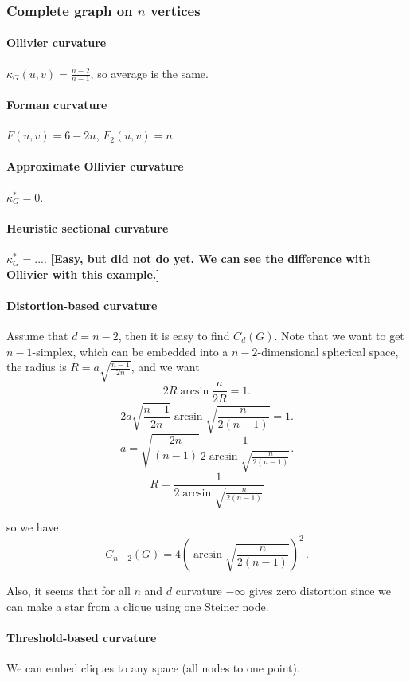 \documentclass{article} %
\begin{document}
\subsubsection{Complete graph on $n$ vertices}

\paragraph{Ollivier curvature}  
$\kappa_G(u,v) = \frac{n-2}{n-1}$, so average is the same.

\paragraph{Forman curvature} 

$F(u,v) = 6 - 2n$, $F_2(u,v) = n$.

\paragraph{Approximate Ollivier curvature} 

$\kappa_G^* = 0$.

\paragraph{Heuristic sectional curvature} 

$\kappa_G^* = ...$. \textbf{[Easy, but did not do yet. We can see the difference with Ollivier with this example.]}

\paragraph{Distortion-based curvature}

Assume that $d = n-2$, then it is easy to find $C_d(G)$. Note that we want to get $n-1$-simplex, which can be embedded into a $n-2$-dimensional spherical space, the radius is $R = a\sqrt{\frac{n-1}{2n}}$, and we want
\[
2 R \arcsin \frac{a}{2R} = 1.
\]
\[
2 a\sqrt{\frac{n-1}{2n}} \arcsin \sqrt{\frac{n}{2(n-1)}} = 1.
\]
\[
a  = \sqrt{\frac{2n}{(n-1)}}\frac{1}{2\arcsin \sqrt{\frac{n}{2(n-1)}}}.
\]
\[
R = \frac{1}{2\arcsin \sqrt{\frac{n}{2(n-1)}}}
\]

so we have
\[
C_{n-2}(G) = 4 \left(\arcsin \sqrt{\frac{n}{2(n-1)}}\right)^2\,.
\]

Also, it seems that for all $n$ and $d$ curvature $-\infty$ gives zero distortion since we can make a star from a clique using one Steiner node.

\paragraph{Threshold-based curvature} We can embed cliques to any space (all nodes to one point).
\end{document}
